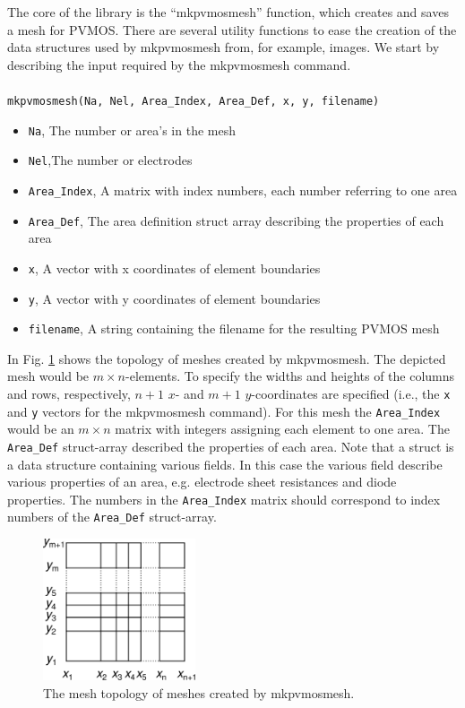 \documentclass[noshowpacs,preprintnumbers,amsmath,amssymb, letter]{revtex4}
\newcommand{\Fig}[1]{Fig. \ref{#1}}
\begin{document}
The core of the library is the ``mkpvmosmesh'' function, which creates and saves a mesh for PVMOS. There are several utility functions to ease the creation of the data structures used by mkpvmosmesh from, for example, images. We start by describing the input required by the mkpvmosmesh command.\\ \\
\texttt{mkpvmosmesh(Na, Nel, Area\_Index, Area\_Def, x, y, filename)} \\
\begin{itemize}
\item{} \texttt{Na}, The number or area's in the mesh
\item{} \texttt{Nel},The number or electrodes
\item{} \texttt{Area\_Index}, A matrix with index numbers, each number referring to one area
\item{} \texttt{Area\_Def}, The area definition struct array describing the properties of each area
\item{} \texttt{x}, A vector with x coordinates of element boundaries
\item{} \texttt{y}, A vector with y coordinates of element boundaries
\item{} \texttt{filename}, A string containing the filename for the resulting PVMOS mesh
\end{itemize}
 
In \Fig{meshtopo} shows the topology of meshes created by mkpvmosmesh. The depicted mesh would be $m \times n$-elements. To specify the widths and heights of the columns and rows, respectively, $n+1$ $x$- and $m+1$ $y$-coordinates are specified (i.e., the \texttt{x} and \texttt{y} vectors for the mkpvmosmesh command). For this mesh the \texttt{Area\_Index} would be an 
$m \times n$ matrix with integers assigning each element to one area. The \texttt{Area\_Def} struct-array described the properties of each area. Note that a struct is a data structure containing various fields. In this case the various field describe various properties of an area, e.g. electrode sheet resistances and diode properties. The numbers in the \texttt{Area\_Index} matrix should correspond to index numbers of the \texttt{Area\_Def} struct-array.

\begin{figure}
\includegraphics[width=0.4\textwidth]{Octave_PVMOS_Mesh_Topology}
\caption{\label{meshtopo}The mesh topology of meshes created by mkpvmosmesh.}
\end{figure}
\end{document}
